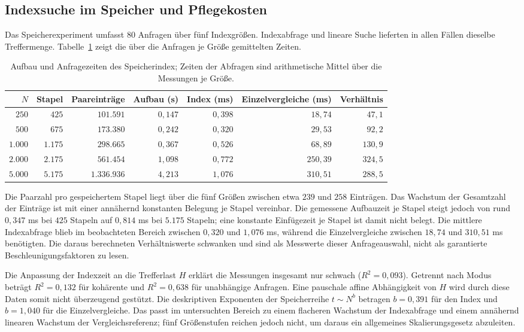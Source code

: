 \documentclass[a4paper,12pt, twoside]{report}
\theoremstyle{definition}
\begin{document}
\subsection{Indexsuche im Speicher und Pflegekosten}

Das Speicherexperiment umfasst $80$ Anfragen über fünf Indexgrößen. Indexabfrage und lineare Suche lieferten in allen Fällen dieselbe Treffermenge. Tabelle~\ref{tab:ucx_memory_results} zeigt die über die Anfragen je Größe gemittelten Zeiten.

\begin{table}[!ht]
	\centering
	\small
	\caption{Aufbau und Anfragezeiten des Speicherindex; Zeiten der Abfragen sind arithmetische Mittel über die Messungen je Größe.}
	\label{tab:ucx_memory_results}
	\begin{tabular}{rrrrrrr}
		\toprule
		$N$ & Stapel & Paareinträge & Aufbau (s) & Index (ms) & Einzelvergleiche (ms) & Verhältnis \\
		\midrule
		$250$ & $425$ & $101.591$ & $0{,}147$ & $0{,}398$ & $18{,}74$ & $47{,}1$ \\
		$500$ & $675$ & $173.380$ & $0{,}242$ & $0{,}320$ & $29{,}53$ & $92{,}2$ \\
		$1.000$ & $1.175$ & $298.665$ & $0{,}367$ & $0{,}526$ & $68{,}89$ & $130{,}9$ \\
		$2.000$ & $2.175$ & $561.454$ & $1{,}098$ & $0{,}772$ & $250{,}39$ & $324{,}5$ \\
		$5.000$ & $5.175$ & $1.336.936$ & $4{,}213$ & $1{,}076$ & $310{,}51$ & $288{,}5$ \\
		\bottomrule
	\end{tabular}
\end{table}

Die Paarzahl pro gespeichertem Stapel liegt über die fünf Größen zwischen etwa $239$ und $258$ Einträgen. Das Wachstum der Gesamtzahl der Einträge ist mit einer annähernd konstanten Belegung je Stapel vereinbar. Die gemessene Aufbauzeit je Stapel steigt jedoch von rund $0{,}347$ ms bei $425$ Stapeln auf $0{,}814$ ms bei $5.175$ Stapeln; eine konstante Einfügezeit je Stapel ist damit nicht belegt. Die mittlere Indexabfrage blieb im beobachteten Bereich zwischen $0{,}320$ und $1{,}076$ ms, während die Einzelvergleiche zwischen $18{,}74$ und $310{,}51$ ms benötigten. Die daraus berechneten Verhältniswerte schwanken und sind als Messwerte dieser Anfrageauswahl, nicht als garantierte Beschleunigungsfaktoren zu lesen.

Die Anpassung der Indexzeit an die Trefferlast $H$ erklärt die Messungen insgesamt nur schwach ($R^2=0{,}093$). Getrennt nach Modus beträgt $R^2=0{,}132$ für kohärente und $R^2=0{,}638$ für unabhängige Anfragen. Eine pauschale affine Abhängigkeit von $H$ wird durch diese Daten somit nicht überzeugend gestützt. Die deskriptiven Exponenten der Speicherreihe $t\sim N^b$ betragen $b=0{,}391$ für den Index und $b=1{,}040$ für die Einzelvergleiche. Das passt im untersuchten Bereich zu einem flacheren Wachstum der Indexabfrage und einem annähernd linearen Wachstum der Vergleichsreferenz; fünf Größenstufen reichen jedoch nicht, um daraus ein allgemeines Skalierungsgesetz abzuleiten.
\end{document}
